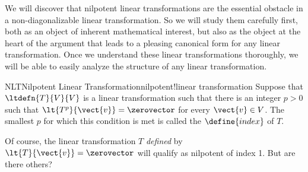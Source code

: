 %
%
We will discover that nilpotent linear transformations are the essential obstacle in a non-diagonalizable linear transformation.  So we will study them carefully first, both as an object of inherent mathematical interest, but also as the object at the heart of the argument that leads to a pleasing canonical form for any linear transformation.  Once we understand these linear transformations thoroughly, we will be able to easily analyze the structure of any linear transformation.\par
%
%
\begin{definition}{NLT}{Nilpotent Linear Transformation}{nilpotent!linear transformation}
Suppose that $\ltdefn{T}{V}{V}$ is a linear transformation such that there is an integer $p>0$ such that $\lt{T^p}{\vect{v}}=\zerovector$ for every $\vect{v}\in V$.  The smallest $p$ for which this condition is met is called the $\define{index}$ of $T$.  
\end{definition}
%
Of course, the linear transformation $T$ {\em defined} by $\lt{T}{\vect{v}}=\zerovector$ will qualify as nilpotent of index 1.  But are there others?
%
